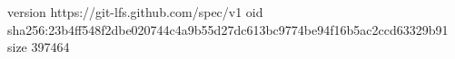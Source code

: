 version https://git-lfs.github.com/spec/v1
oid sha256:23b4ff548f2dbe020744c4a9b55d27dc613bc9774be94f16b5ac2ccd63329b91
size 397464
